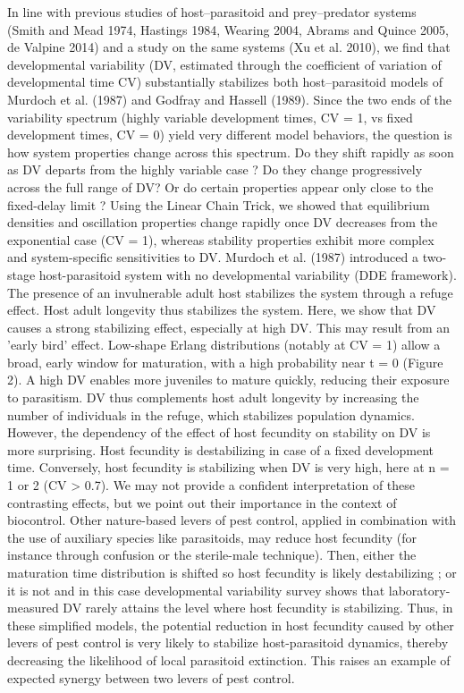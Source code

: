 \documentclass[12pt,a4paper,onecolumn]{article}
\begin{document}
\tabto{1.5 cm} In line with previous studies of host–parasitoid and prey–predator systems (Smith and Mead 1974, Hastings 1984, Wearing 2004, Abrams and Quince 2005, de Valpine 2014) and a study on the same systems (Xu et al. 2010), we find that developmental variability (DV, estimated through the coefficient of variation of developmental time CV) substantially stabilizes both host–parasitoid models of Murdoch et al. (1987) and Godfray and Hassell (1989). Since the two ends of the variability spectrum (highly variable development times, CV = 1, vs fixed development times, CV = 0) yield very different model behaviors, the question is how system properties change across this spectrum. Do they shift rapidly as soon as DV departs from the highly variable case ? Do they change progressively across the full range of DV? Or do certain properties appear only close to the fixed-delay limit ? Using the Linear Chain Trick, we showed that equilibrium densities and oscillation properties change rapidly once DV decreases from the exponential case (CV = 1), whereas stability properties exhibit more complex and system-specific sensitivities to DV.
\tabto{1.5 cm} Murdoch et al. (1987) introduced a two-stage host-parasitoid system with no developmental variability (DDE framework). The presence of an invulnerable adult host stabilizes the system through a refuge effect. Host adult longevity thus stabilizes the system. Here, we show that DV causes a strong stabilizing effect, especially at high DV. This may result from an 'early bird' effect. Low-shape Erlang distributions (notably at CV = 1) allow a broad, early window for maturation, with a high probability near t = 0 (Figure 2). A high DV enables more juveniles to mature quickly, reducing their exposure to parasitism. DV thus complements host adult longevity by increasing the number of individuals in the refuge, which stabilizes population dynamics. However, the dependency of the effect of host fecundity on stability on DV is more surprising. Host fecundity is destabilizing in case of a fixed development time. Conversely, host fecundity is stabilizing when DV is very high, here at n = 1 or 2 (CV > 0.7). We may not provide a confident interpretation of these contrasting effects, but we point out their importance in the context of biocontrol. Other nature-based levers of pest control, applied in combination with the use of auxiliary species like parasitoids, may reduce host fecundity (for instance through confusion or the sterile-male technique). Then, either the maturation time distribution is shifted so host fecundity is likely destabilizing ; or it is not and in this case developmental variability survey shows that laboratory-measured DV rarely attains the level where host fecundity is stabilizing. Thus, in these simplified models, the potential reduction in host fecundity caused by other levers of pest control is very likely to stabilize host-parasitoid dynamics, thereby decreasing the likelihood of local parasitoid extinction. This raises an example of expected synergy between two levers of pest control. 
\end{document}
